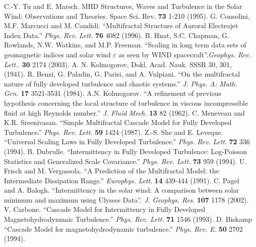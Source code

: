 \documentclass[preprint2]{aastex}
\begin{document}
\begin{thebibliography}{}
 C.-Y. Tu and E. Marsch. MHD Structures, Waves and Turbulence in the Solar Wind: Observations and Theories. Space Sci. Rev. {\bf 73} 1-210 (1995).
 G. Consolini, M.F. Marcucci and M. Candidi. ``Multifractal Structure of Auroral Electrojet Index Data.'' {\it Phys. Rev. Lett.} {\bf 76} 4082 (1996).
 B. Hnat, S.C. Chapman, G. Rowlands, N.W. Watkins, and M.P. Freeman. ``Scaling in long term data sets of geomagnetic indices and solar wind $\varepsilon$ as seen by WIND spacecraft''.{\it Geophys. Rev. Lett.}. {\bf 30} 2174 (2003).
 A. N. Kolmogorov, Dokl. Acad. Nauk. SSSR 30, 301, (1941).
 R. Benzi, G. Paladin, G. Parisi, and A. Vulpiani. ``On the multifractal nature of fully developed turbulence and chaotic systems.'' {\it J. Phys. A: Math. Gen.} {\bf 17} 3521-3531 (1984).
 A.N. Kolmogorov. ``A refinement of previous hypothesis concerning the local structure of turbulence in viscous incompressible fluid at high Reynolds number.'' {\it J. Fluid Mech.} {\bf 13} 82 (1962).
 C. Meneveau and K.R. Sreenivasan. ``Simple Multifractal Cascade Model for Fully Developed Turbulence.'' {\it Phys. Rev. Lett.} {\bf 59} 1424 (1987).
 Z.-S. She and E. Leveque. ``Universal Scaling Laws in Fully Developed Turbulence.'' {\it Phys. Rev. Lett.} {\bf 72} 336 (1994).
 B. Dubrulle. ``Intermittency in Fully Developed Turbulence: Log-Poisson Statistics and Generalized Scale Covariance.'' {\it Phys. Rev. Lett.} {\bf 73} 959 (1994).
 U. Frisch and M. Vergassola. ``A Prediction of the Multifractal Model: the Intermediate Dissipation Range.'' {\it Europhys. Lett.} {\bf 14} 439-444 (1991).
 C. Pagel and A. Balogh. ``Intermittency in the solar wind: A comparison between solar minimum and maximum using Ulysses Data''. {\it J. Geophys. Res.} {\bf 107} 1178 (2002).
 V. Carbone. ``Cascade Model for Intermittency in Fully Developed Magnetohydrodynmaic Turbulence.'' {\it Phys. Rev. Lett.} {\bf 71} 1546 (1993).
 D. Biskamp ``Cascade Model for magnetohydrodynamic turbulence.'' {\it Phys. Rev. E}. {\bf 50} 2702 (1994).

\end{thebibliography}
\end{document}
